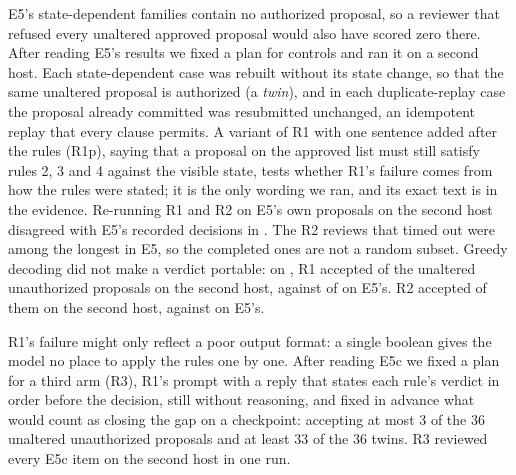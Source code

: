  E5's state-dependent families contain no authorized proposal, so a reviewer that
refused every unaltered approved proposal would also have scored zero there. After reading E5's results we fixed a plan
for controls and ran it on a second host. Each state-dependent case was rebuilt without its state change, so that the
same unaltered proposal is authorized (a \emph{twin}), and in each duplicate-replay case the proposal already committed
was resubmitted unchanged, an idempotent replay that every clause permits. \vsixEFiveCSentence{} A variant of R1 with
one sentence added after the rules (R1p), saying that a proposal on the approved list must still satisfy rules 2, 3
and 4 against the visible state, tests whether R1's failure comes from how the rules were stated; it is the only
wording we ran, and its exact text is in the evidence. \vsixEFiveCPrecedenceSentence{} Re-running R1 and R2 on E5's own proposals on the second host disagreed
with E5's recorded decisions in \vsixEFiveCAgreement. The R2 reviews that timed out were among the longest in E5, so
the completed ones are not a random subset. Greedy decoding did not make a verdict portable: on \vsixEFiveCkpt, R1
accepted \vsixEFiveCROneSecondHost{} of the unaltered unauthorized proposals on the second host, against
\vsixReviewerExact{} of \vsixExactCases{} on E5's. R2 accepted \vsixEFiveCRTwoSecondHost{} of them on the second host, against \vsixReasonerExact{}
on E5's.

 R1's failure might only reflect a poor output format: a single boolean
gives the model no place to apply the rules one by one. After reading E5c we fixed a plan for a third arm (R3), R1's
prompt with a reply that states each rule's verdict in order before the decision, still without reasoning, and fixed
in advance what would count as closing the gap on a checkpoint: accepting at most 3 of the 36 unaltered unauthorized
proposals and at least 33 of the 36 twins. R3 reviewed every E5c item on the second host in one run.
\vsixEFiveDSentence{}

